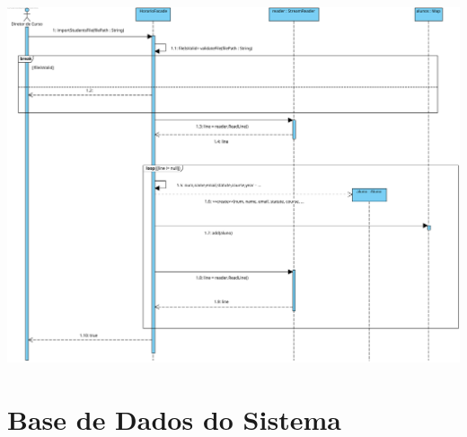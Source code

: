 \documentclass[a4paper,12pt]{scrreprt}
\begin{document}
\begin{minipage}{\textwidth}
    \centering
    \includegraphics[width=1\textwidth]{images/sequence-diagrams/3-importar-alunos.png}
    \label{fig:8-3-diagrama_de_sequencia_importar_alunos}
\end{minipage}



\chapter{Base de Dados do Sistema}
\vspace{1cm}
\end{document}
